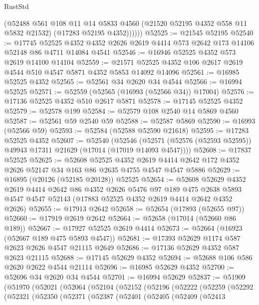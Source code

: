 \begin{lexlean}{RustStd}
\begin{coremodule}
{\begin{coremodule}
{{{{{{{{{{{{{{{{{{{{{{{{{{{{{{{{{{{{{{{{{{{{{{{{{{{{{{{            (@52488
              @561
              @108
              @11
              @14
              @5833
              @4560
              (@21520 @52195 @4352 @558 @11 @5832 @21532)
              (@17283 @52195 @4352))))))
@52525 := @21545 @52195
@52540 := @17745
    @52525
    @4352
    @4352
    @2626
    @2619
    @4414
    @573
    @2642
    @173
    @14106
    @52148
    @86
    @4711
    @14084
    @4541
@52546 := @16946 @52525 @4352 @573 @2619 @14100 @14104
@52559 := @21571 @52525 @4352 @106 @2617 @2619 @4544 @510 @4547 @5871 @4352 @5853 @14092 @14096
@52561 := @16985 @52525 @4352
@52565 := @52561 @34 @2620 @34 @4544
@52566 := @16994 @52525
@52571 := @52559 (@52565 (@16993 (@52566 @34)) @17004)
@52576 := @17136 @52525 @4352 @510 @2617 @5871
@52578 := @17145 @52525 @4352
@52579 := @52578 @199
@52584 := @52579 @108 @2540 @14 @5869 @4560
@52587 := @52561 @59 @2540 @59
@52588 := @52587 @5869
@52590 := @16993 (@52566 @59)
@52593 := @52584 (@52588 @52590 @21618)
@52595 := @17283 @52525 @4352
@52607 := @52540
    (@52546 (@52571 (@52576 (@52593 @52595)) @49943 @17311 @21629 (@17014 (@17019 @14093 @4547))))
@52608 := @17837 @52525
@52625 := @52608
    @52525
    @4352
    @2619
    @4414
    @2642
    @172
    @4352
    @2626
    @52147
    @34
    @163
    @86
    @2635
    @4755
    @4547
    @4547
    @5886
@52629 := @16895 (@20126 (@52185 @20128)) @52525
@52654 := @52608
    @52629
    @4352
    @2619
    @4414
    @2642
    @86
    @4352
    @2626
    @5476
    @97
    @189
    @475
    @2638
    @5893
    @4547
    @4547
    @52143
    (@17883 @52525 @4352 @2619 @4414 @2642 @4352 @2626)
@52655 := @17913 @2642
@52658 := @52654 (@17893 (@52655 @97))
@52660 := @17919 @2619 @2642
@52664 := @52658 (@17014 (@52660 @86 @189))
@52667 := @17927 @52525 @2619 @4414
@52673 := @52664 (@16923 (@52667 @189 @475 @5893 @4547))
@52681 := @17393 @52629 @1174 @587 @2623 @2626 @4547 @21115 @2649
@52686 := @17136 @52629 @4352 @587 @2623 @21115
@52688 := @17145 @52629 @4352
@52694 := @52688 @106 @586 @2620 @2622 @4544 @21114
@52696 := @16985 @52629 @4352
@52700 := @52696 @34 @2620 @34 @4544
@52701 := @16994 @52629
@52837 := @51909
    (@51970
      (@52021
        (@52064
          (@52104
            (@52152
              (@52196
                (@52222
                  (@52259
                    (@52292
                      (@52321
                        (@52350
                          (@52371
                            (@52387
                              (@52401
                                (@52405
                                  (@52409
                                    (@52413
}}}}}}}}}}}}}}}}}}}}}}}}}}}}}}}}}}}}}}}}}}}}}}}}}}}}}}}
\end{coremodule}}
\end{coremodule}
\end{lexlean}
